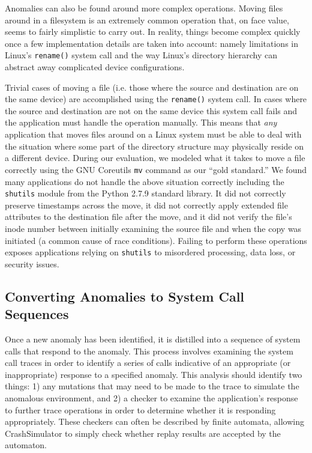     Anomalies can also be found around more complex operations.  Moving files
    around in a filesystem is an extremely common operation that, on face value,
    seems to fairly simplistic to carry out.  In reality, things become complex
    quickly once a few implementation details are taken into account: namely
    limitations in Linux's {\tt rename()} system call and the way Linux's
    directory hierarchy can abstract away complicated device configurations.

    Trivial cases of moving a file (i.e. those where the source and destination
    are on the same device) are accomplished using the {\tt rename()} system
    call.  In cases where the source and destination are not on the same device
    this system call fails and the application must handle the operation
    manually. This means that \emph{any} application that moves files around on
    a Linux system must be able to deal with the situation where some part of
    the directory structure may physically reside on a different device.
    During our evaluation, we modeled what
    it takes to move a file correctly using the GNU Coreutils {\tt mv} command
    as our ``gold standard.''  We found many applications do not handle the
    above situation correctly including the {\tt shutils} module from the Python
    2.7.9 standard library.  It did not correctly preserve timestamps across the
    move, it did not correctly apply extended file attributes to the destination
    file after the move, and it did not verify the file's inode number between
    initially examining the source file and when the copy was initiated (a
    common cause of race conditions).  Failing to perform these operations
    exposes applications relying on {\tt shutils} to misordered processing, data
    loss, or security issues.

    \subsection{Converting Anomalies to System Call Sequences}

    Once a new anomaly has been identified, it is distilled into a sequence of
    system calls that respond to the anomaly.  This process
    involves examining the system call traces %
    in order to
    identify a series of calls indicative of an appropriate (or inappropriate)
    response to a specified anomaly.
    This analysis should identify two things: 1) any mutations that may need to be
    made to the trace to simulate the anomalous environment, and 2) a checker to
    examine the application's response to further trace operations in order to
    determine
    whether it is responding appropriately. These checkers can often be 
    described by finite automata, allowing CrashSimulator to simply check
    whether replay results are accepted by the automaton.

